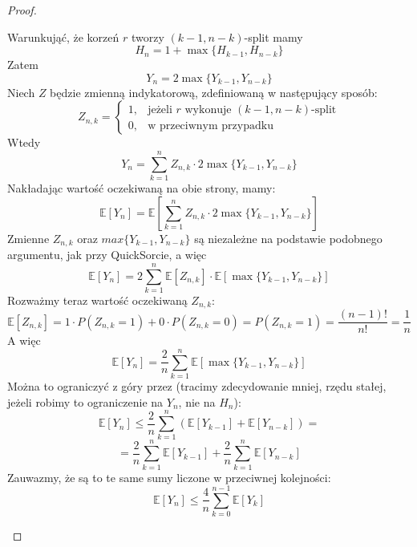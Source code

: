 \documentclass[11pt,a4paper]{article}
\begin{document}
\begin{proof}
\begin{enumerate}
\begin{center}
            \end{center}
            Warunkująć, że korzeń $r$ tworzy $(k-1, n-k)$-split mamy
            \[
                H_n = 1 + \max\{H_{k-1}, H_{n-k}\}
            \]
            Zatem
            \[
                Y_n = 2\max\{Y_{k-1}, Y_{n-k}\}
            \]
            Niech $Z$ będzie zmienną indykatorową, zdefiniowaną w następujący sposób:
            \[
                Z_{n,k} = \begin{cases}
                    1, & \text{jeżeli $r$ wykonuje } (k-1, n-k)\text{-split} \\
                    0, & \text{w przeciwnym przypadku}
                \end{cases}
            \]
            Wtedy
            \[
                Y_n = \sum_{k=1}^n Z_{n,k} \cdot 2 \max\{Y_{k-1}, Y_{n-k}\}
            \]
            Nakładając wartość oczekiwaną na obie strony, mamy:
            \[
                \mathbb{E}[Y_n] = \mathbb{E}\left[ \sum_{k=1}^n Z_{n,k} \cdot 2 \max\{Y_{k-1}, Y_{n-k}\} \right]
            \]
            Zmienne $Z_{n,k}$ oraz $max\{Y_{k-1}, Y_{n-k}\}$ są niezależne na podstawie podobnego argumentu, jak przy QuickSorcie, a więc
            \[
                \mathbb{E}[Y_n] = 2 \sum_{k=1}^n \mathbb{E}[Z_{n,k}] \cdot \mathbb{E}\left[\max\{Y_{k-1}, Y_{n-k}\}\right]
            \]
            Rozważmy teraz wartość oczekiwaną $Z_{n,k}$:
            \[
                \mathbb{E}[Z_{n,k}] = 1 \cdot P(Z_{n,k} = 1) + 0 \cdot P(Z_{n,k} = 0) = P(Z_{n,k} = 1) = \frac{(n-1)!}{n!} = \frac{1}{n}
            \]
            A więc
            \[
                \mathbb{E}[Y_n] = \frac{2}{n} \sum_{k=1}^n \mathbb{E}\left[\max\{Y_{k-1}, Y_{n-k}\}\right]
            \]
            Można to ograniczyć z góry przez (tracimy zdecydowanie mniej, rzędu stałej, jeżeli robimy to ograniczenie na $Y_n$, nie na $H_n$):
            \[
                \mathbb{E}[Y_n] \leq \frac{2}{n} \sum_{k=1}^n \left(\mathbb{E}[Y_{k-1}] + \mathbb{E}[Y_{n-k}]\right) =
            \]
            \[
                = \frac{2}{n} \sum_{k=1}^n \mathbb{E}[Y_{k-1}] + \frac{2}{n} \sum_{k=1}^n \mathbb{E}[Y_{n-k}]
            \]
            Zauwazmy, że są to te same sumy liczone w przeciwnej kolejności:
            \[
                \mathbb{E}[Y_n] \leq \frac{4}{n} \sum_{k=0}^{n-1} \mathbb{E}[Y_k]
            \]

\end{enumerate}
\end{proof}
\end{document}
